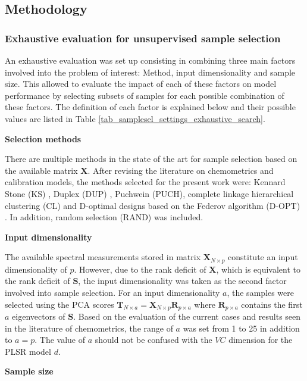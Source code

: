 \documentclass[journal=ancham,manuscript=article]{achemso}
\begin{document}
\subsection{Methodology}\label{methodology}

\subsubsection{Exhaustive evaluation for unsupervised sample selection}

An exhaustive evaluation was set up consisting in combining three main factors involved into the problem of interest: Method, input dimensionality and sample size. This allowed to evaluate the impact of each of these factors on model performance by selecting subsets of samples for each possible combination of these factors. The definition of each factor is explained below and their possible values are listed in Table \ref{tab_samplesel_settings_exhaustive_search}.

\textbf{Selection methods}

There are multiple methods in the state of the art for sample selection based on the available matrix $\mathbf{X}$. After revising the literature on chemometrics and calibration models, the methods selected for the present work were: Kennard Stone (KS) \cite{Kennard1969}, Duplex (DUP) \cite{Snee1977}, Puchwein (PUCH)\cite{Puchwein1988}, complete linkage hierarchical clustering (CL) \cite{Naes1990} and D-optimal designs based on the Federov algorithm (D-OPT) \cite{Goos2011}. In addition, random selection (RAND) was included. 

\textbf{Input dimensionality}

The available spectral measurements stored in matrix $\mathbf{X}_{N\times p}$ constitute an input dimensionality of $p$. However, due to the rank deficit of $\mathbf{X}$, which is equivalent to the rank deficit of $\mathbf{S}$, the input dimensionality was taken as the second factor involved into sample selection. For an input dimensionality $a$, the samples were selected using the PCA scores $\mathbf{T}_{N\times a} = \mathbf{X}_{N\times p}\mathbf{R}_{p\times a}$ where $\mathbf{R}_{p\times a}$ contains the first $a$ eigenvectors of $\mathbf{S}$. Based on the evaluation of the current cases and results seen in the literature of chemometrics, the range of $a$ was set from 1 to 25 in addition to $a=p$. The value of $a$ should not be confused with the $VC$ dimension for the PLSR model $d$. 

\textbf{Sample size}
\end{document}
